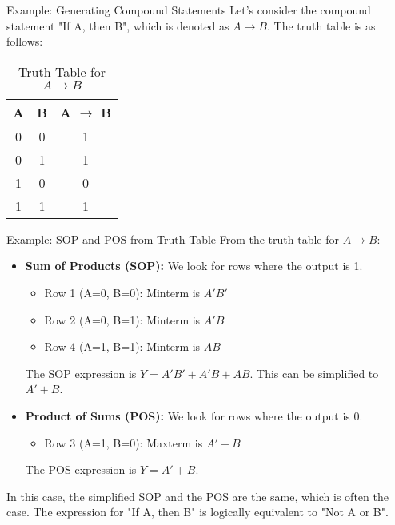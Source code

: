 \documentclass{beamer}
\begin{document}
\begin{frame}{Example: Generating Compound Statements}
    Let's consider the compound statement "If A, then B", which is denoted as $A
    \rightarrow B$. The truth table is as follows:
    \begin{table}
        \centering
        \begin{tabular}{|c|c|c|}
            \hline
            \textbf{A} & \textbf{B} & \textbf{A $\rightarrow$ B} \\
            \hline
            0 & 0 & 1 \\
            0 & 1 & 1 \\
            1 & 0 & 0 \\
            1 & 1 & 1 \\
            \hline
        \end{tabular}
        \caption{Truth Table for $A \rightarrow B$}
    \end{table}
\end{frame}

\begin{frame}{Example: SOP and POS from Truth Table}
    From the truth table for $A \rightarrow B$:
    \begin{itemize}
        \item \textbf{Sum of Products (SOP):} We look for rows where the output
        is 1.
        \begin{itemize}
            \item Row 1 (A=0, B=0): Minterm is $A'B'$
            \item Row 2 (A=0, B=1): Minterm is $A'B$
            \item Row 4 (A=1, B=1): Minterm is $AB$
        \end{itemize}
        The SOP expression is $Y = A'B' + A'B + AB$. This can be simplified to
        $A' + B$.
        
        \item \textbf{Product of Sums (POS):} We look for rows where the output
        is 0.
        \begin{itemize}
            \item Row 3 (A=1, B=0): Maxterm is $A'+B$
        \end{itemize}
        The POS expression is $Y = A'+B$.
    \end{itemize}
    In this case, the simplified SOP and the POS are the same, which is often
    the case. The expression for "If A, then B" is logically equivalent to "Not
    A or B".
\end{frame}
\end{document}
